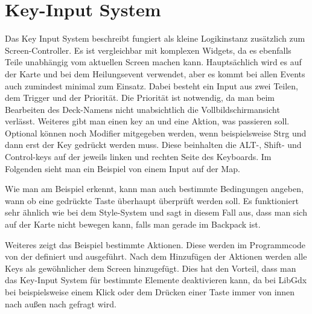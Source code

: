 \renewcommand{\kapitelautor}{Autor: Felix Zwickelstorfer}


\section{Key-Input System}\label{sec:key-input-system}
\renewcommand{\kapitelautor}{Autor: Felix Zwickelstorfer}

Das Key Input System beschreibt fungiert als kleine Logikinstanz zusätzlich zum Screen-Controller.
Es ist vergleichbar mit komplexen Widgets, da es ebenfalls Teile unabhängig vom aktuellen Screen machen kann.
Hauptsächlich wird es auf der Karte und bei dem Heilungsevent verwendet, aber es kommt bei allen Events auch zumindest minimal zum Einsatz.
Dabei besteht ein Input aus zwei Teilen, dem Trigger und der Priorität.
Die Priorität ist notwendig, da man \zB beim Bearbeiten des Deck-Namens nicht unabsichtlich die Vollbildschirmansicht verlässt.
Weiteres gibt man einen key an und eine Aktion, was passieren soll.
Optional können noch Modifier mitgegeben werden, wenn beispielsweise Strg und dann erst der Key gedrückt werden muss.
Diese beinhalten die ALT-, Shift- und Control-keys auf der jeweils linken und rechten Seite des Keyboards.
Im Folgenden sieht man ein Beispiel von einem Input auf der Map.


Wie man am Beispiel erkennt, kann man auch bestimmte Bedingungen angeben, wann \bzw ob eine gedrückte Taste überhaupt überprüft werden soll.
Es funktioniert sehr ähnlich wie bei dem Style-System und sagt in diesem Fall aus, dass man sich auf der Karte nicht bewegen kann, falls man gerade im Backpack ist.

Weiteres zeigt das Beispiel bestimmte Aktionen.
Diese werden im Programmcode von der  definiert und ausgeführt.
Nach dem Hinzufügen der Aktionen werden alle Keys als gewöhnlicher  dem Screen hinzugefügt.
Dies hat den Vorteil, dass man das Key-Input System für bestimmte Elemente deaktivieren kann, da bei LibGdx bei beispielsweise einem Klick oder dem Drücken einer Taste immer von innen nach außen nach  gefragt wird.
